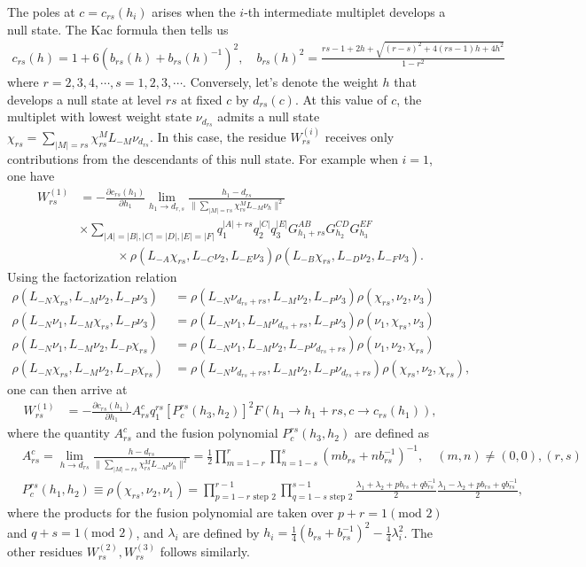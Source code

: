 \documentclass[12pt]{article}
\newcommand{\ie}{\begin{equation}\begin{aligned}}
\newcommand{\fe}{\end{aligned}\end{equation}}
\numberwithin{equation}{section}
\begin{document}
The poles at $c=c_{rs}(h_i)$ arises when the $i$-th intermediate multiplet develops a null state. The Kac formula then tells us
\ie
c_{r s}(h)=1+6\left(b_{r s}(h)+b_{r s}(h)^{-1}\right)^2,\quad  b_{r s}(h)^2=\frac{r s-1+2 h+\sqrt{ (r-s)^2+4(r s-1) h+4 h^2}}{1-r^2}
\fe
where $r=2,3,4, \cdots, s=1,2,3, \cdots$. Conversely, let's denote the weight $h$ that develops a null state at level $rs$ at fixed $c$ by $d_{rs}(c)$. At this value of $c$, the multiplet with lowest weight state $\nu_{d_{rs}}$ admits a null state $\chi_{rs}=\sum_{|M|=rs}\chi_{rs}^M L_{-M}\nu_{d_{rs}}$. In this case, the residue $W_{rs}^{(i)}$ receives only contributions from the descendants of this null state. For example when $i=1$, one have
\ie
W^{(1)}_{rs} &= -\frac{\partial c_{rs}(h_1)}{\partial h_1}\lim_{h_1\rightarrow d_{r,s}} \frac{h_1-d_{rs}}{\|\sum_{|M|=rs} \chi_{rs}^M L_{-M}\nu_h \|^2} \\
&\times  \sum_{|A|=|B|,|C|=|D|,|E|=|F|} q_1^{|A|+rs} q_2^{|C|} q_3^{|E|} G_{h_1+rs}^{A B} G_{h_2}^{C D} G_{h_3}^{E F} \\
&\quad \quad \quad  \times \rho\left(L_{-A} \chi_{rs}, L_{-C} \nu_2, L_{-E} \nu_3\right) \rho\left(L_{-B}  \chi_{rs}, L_{-D}\nu_2, L_{-F} \nu_3\right).
\fe
Using the factorization relation
\ie
\rho\left(L_{-N} \chi_{r s}, L_{-M} \nu_2, L_{-P} \nu_3 \right) & =\rho\left(L_{-N} \nu_{d_{r s}+r s}, L_{-M} \nu_2, L_{-P} \nu_3 \right) \rho\left(\chi_{r s}, \nu_2, \nu_3 \right) \\
\rho\left(L_{-N} \nu_1, L_{-M} \chi_{r s}, L_{-P} \nu_3 \right) & =\rho\left(L_{-N} \nu_1, L_{-M} \nu_{d_{r s}+r s}, L_{-P} \nu_3 \right) \rho\left(\nu_1, \chi_{r s}, \nu_3 \right) \\
\rho\left(L_{-N} \nu_1, L_{-M} \nu_2, L_{-P} \chi_{r s} \right) & =\rho\left(L_{-N} \nu_1, L_{-M} \nu_2, L_{-P} \nu_{d_{r s}+r s} \right) \rho\left(\nu_1, \nu_2, \chi_{r s} \right) \\
\rho\left(L_{-N} \chi_{r s}, L_{-M} \nu_2, L_{-P} \chi_{r s} \right) & =\rho\left(L_{-N} \nu_{d_{r s}+r s}, L_{-M} \nu_2, L_{-P} \nu_{d_{r s}+r s} \right) \rho\left(\chi_{r s}, \nu_2, \chi_{r s} \right) ,
\fe
one can then arrive at
\ie
W^{(1)}_{rs} &= -\frac{\partial c_{rs}(h_1)}{\partial h_1} A^c_{rs} q_1^{rs} [P_c^{rs}(h_3, h_2)]^2 F(h_1\rightarrow h_1+rs,c\rightarrow c_{rs}(h_1)),
\fe
where the quantity $A^c_{rs}$ and the fusion polynomial $P_c^{rs}(h_3, h_2)$ are defined as
\ie\label{norm_fusion_poly}
&A_{r s}^c=\lim _{h \rightarrow d_{r s}}\frac{h-d_{r s}}{\|\sum_{|M|=rs} \chi_{rs}^M L_{-M}\nu_h \|^2}=\frac{1}{2} \prod_{m=1-r}^r \prod_{n=1-s}^s\left(m b_{rs}+n b^{-1}_{rs}\right)^{-1}, \quad(m, n) \neq(0,0),(r, s)\\
&P_c^{r s}(h_1, h_2)  \equiv \rho\left(\chi_{r s}, \nu_2, \nu_1\right) =\prod_{p=1-r \text { step } 2}^{r-1} \prod_{q=1-s \text { step } 2}^{s-1} \frac{\lambda_1+\lambda_2+p b_{rs}+q b^{-1}_{rs}}{2} \frac{\lambda_1-\lambda_2+p b_{rs}+q b^{-1}_{rs}}{2},
\fe
where the products for the fusion polynomial are taken over $p+r=1 (\text{mod }2)$ and $q+s=1 (\text{mod }2)$, and $\lambda_i$ are defined by $h_i = \frac{1}{4}(b_{rs}+b^{-1}_{rs})^2-\frac{1}{4}\lambda_i^2$. The other residues $W_{rs}^{(2)}, W_{rs}^{(3)}$ follows similarly. 
\end{document}
